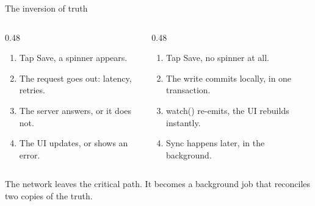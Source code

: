 \documentclass[10pt,aspectratio=169,t]{beamer}
\begin{document}
\begin{frame}[eyebrow=Offline-first]{The inversion of truth}
  \vskip 2mm
  \begin{columns}[T]
    \begin{column}{0.48\textwidth}
      \begin{enumerate}
        \item Tap Save, a spinner appears.
        \item The request goes out: latency, retries.
        \item The server answers, or it does not.
        \item The UI updates, or shows an error.
      \end{enumerate}
    \end{column}
    \begin{column}{0.48\textwidth}
      \begin{enumerate}
        \item Tap Save, no spinner at all.
        \item The write commits locally, in one transaction.
        \item watch() re-emits, the UI rebuilds instantly.
        \item Sync happens later, in the background.
      \end{enumerate}
    \end{column}
  \end{columns}
  \begin{takeaway}{The network leaves the critical path.}
    It becomes a background job that reconciles two copies of the truth.
  \end{takeaway}
\end{frame}
\end{document}
